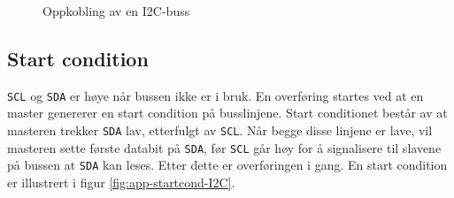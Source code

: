 \begin{figure}[ht]
{}
    \caption{Oppkobling av en I2C-buss}
    \label{fig:app-I2cbuss}
\end{figure}
\subsection*{Start condition}

\verb|SCL| og \verb|SDA| er høye når bussen ikke er i bruk. En overføring startes ved at en master genererer en start condition på busslinjene. Start conditionet består av at masteren trekker \verb|SDA| lav, etterfulgt av \verb|SCL|. Når begge disse linjene er lave, vil masteren sette første databit på \verb|SDA|, før \verb|SCL| går høy for å signalisere til slavene på bussen at \verb|SDA| kan leses. Etter dette er overføringen i gang. En start condition er illustrert i figur \ref{fig:app-startcond-I2C}.

